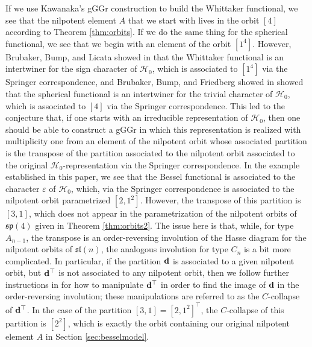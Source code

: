 \documentclass[11pt,letterpaper]{article}
\newcommand{\calH}{\mathcal{H}} %
\newcommand{\ve}{\varepsilon}
\newcommand{\goth}{\mathfrak}
\renewcommand{\sp}{\goth{sp}}
\renewcommand{\sl}{\goth{sl}}
\theoremstyle{remark}
\numberwithin{equation}{section}
\begin{document}
If we use Kawanaka's gGGr construction to build the Whittaker functional, we see that the nilpotent element $A$ that we start with lives in the orbit $[4]$ according to Theorem \ref{thm:orbits}. If we do the same thing for the spherical functional, we see that we begin with an element of the orbit $[1^4]$. However, Brubaker, Bump, and Licata showed in \cite{BBL} that the Whittaker functional is an intertwiner for the sign character of $\calH_0$, which is associated to $[1^4]$ via the Springer correspondence, and Brubaker, Bump, and Friedberg showed in \cite{BBF} showed that the spherical functional is an intertwiner for the trivial character of $\calH_0$, which is associated to $[4]$ via the Springer correspondence. This led to the conjecture that, if one starts with an irreducible representation of $\calH_0$, then one should be able to construct a gGGr in which this representation is realized with multiplicity one from an element of the nilpotent orbit whose associated partition is the transpose of the partition associated to the nilpotent orbit associated to the original $\calH_0$-representation via the Springer correspondence. In the example established in this paper, we see that the Bessel functional is associated to the character $\ve$ of $\calH_0$, which, via the Springer correspondence is associated to the nilpotent orbit parametrized $[2,1^2]$. However, the transpose of this partition is $[3,1]$, which does not appear in the parametrization of the nilpotent orbits of $\sp(4)$ given in Theorem \ref{thm:orbits2}. The issue here is that, while, for type $A_{n-1}$, the transpose is an order-reversing involution of the Hasse diagram for the nilpotent orbits of $\sl(n)$, the analogous involution for type $C_n$ is a bit more complicated. In particular, if the partition ${\bf d}$ is associated to a given nilpotent orbit, but ${\bf d}^{\top}$ is not associated to any nilpotent orbit, then we follow further instructions in \cite{CM} for how to manipulate ${\bf d}^{\top}$ in order to find the image of ${\bf d}$ in the order-reversing involution; these manipulations are referred to as the $C$-collapse of ${\bf d}^{\top}$. In the case of the partition $[3,1] = [2,1^2]^{\top}$, the $C$-collapse of this partition is $[2^2]$, which is exactly the orbit containing our original nilpotent element $A$ in Section \ref{sec:besselmodel}.
\end{document}
